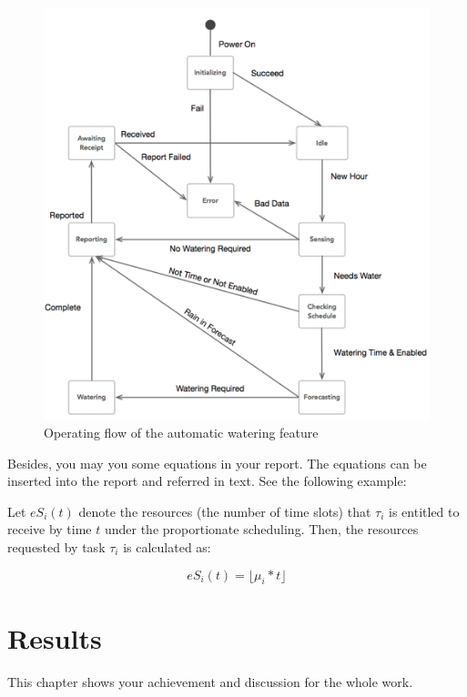 \documentclass[12pt]{report}
\begin{document}
	\begin{figure}[ht]
		\begin{center}
			\includegraphics[width=\textwidth]{OperatingFlow.png}
			\caption{Operating flow of the automatic watering feature}\label{fig:operatingflow}
		\end{center}
	\end{figure}
	
	Besides,
	you may you some equations in your report.
	The equations can be inserted into the report and referred in text.
	See the following example: 
	
	Let $eS_i(t)$ denote the resources (the number of time slots) 
	that $\tau_i$ is entitled to receive by time $t$ under the proportionate scheduling.
	Then, the resources requested by task $\tau_i$ is calculated as: 
	
	\begin{equation} \label{eS}
	eS_i(t) = \lfloor \mu_i*t \rfloor
	\end{equation}
	
	\chapter{Results}
	This chapter shows your achievement and discussion for the whole work.
	
\end{document}
